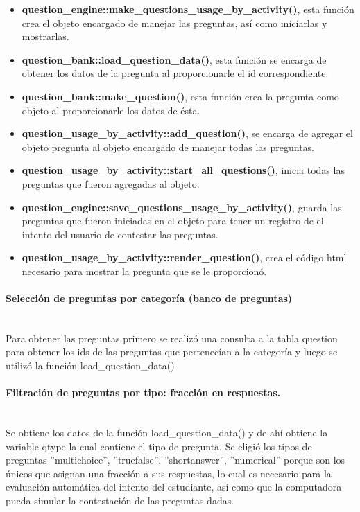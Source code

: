     \begin{itemize}

				\item {\bf question\_engine::make\_questions\_usage\_by\_activity()}, esta función crea el objeto encargado de manejar las preguntas, así como iniciarlas y mostrarlas.
				\item {\bf question\_bank::load\_question\_data()}, esta función se encarga de obtener los datos de la pregunta al proporcionarle el id correspondiente.
				\item {\bf question\_bank::make\_question()}, esta función crea la pregunta como objeto al proporcionarle los datos de ésta.
				\item {\bf question\_usage\_by\_activity::add\_question()}, se encarga de agregar el objeto pregunta al objeto encargado de manejar todas las preguntas.
				\item {\bf question\_usage\_by\_activity::start\_all\_questions()}, inicia todas las preguntas que fueron agregadas al objeto.
				\item {\bf question\_engine::save\_questions\_usage\_by\_activity()}, guarda las preguntas que fueron iniciadas en el objeto para tener un registro de el intento del usuario de contestar las preguntas.
				\item {\bf question\_usage\_by\_activity::render\_question()}, crea el código html necesario para mostrar la pregunta que se le proporcionó.

      \end{itemize}

		\paragraph{Selección de preguntas por categoría (banco de preguntas)}\mbox{}\\

			Para obtener las preguntas primero se realizó una consulta a la tabla question para obtener los ids de las preguntas que pertenecían a la categoría y luego se utilizó la función load\_question\_data()

    \paragraph{Filtración de preguntas por tipo: fracción en respuestas.}\mbox{}\\

			Se obtiene los datos de la función load\_question\_data() y de ahí obtiene la variable qtype la cual contiene el tipo de pregunta. Se eligió los tipos de preguntas ''multichoice'', ''truefalse'', ''shortanswer'', ''numerical'' porque son los únicos que asignan una fracción a sus respuestas, lo cual es necesario para la evaluación automática del intento del estudiante, así como que la computadora pueda simular la contestación de las preguntas dadas.

